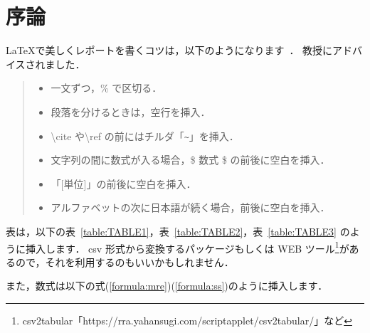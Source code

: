 \section{序論}
    \LaTeX で美しくレポートを書くコツは，以下のようになります~\cite{lit:JOURNAL}．
    教授にアドバイスされました．

    \begin{quote}
        \begin{itemize}
            \item 一文ずつ，\% で区切る．
            \item 段落を分けるときは，空行を挿入．
            \item \textbackslash cite や\textbackslash ref の前にはチルダ「\verb|~|」を挿入．
            \item 文字列の間に数式が入る場合，\$ 数式 \$ の前後に空白を挿入．
            \item 「[単位]」の前後に空白を挿入．
            \item アルファベットの次に日本語が続く場合，前後に空白を挿入．
        \end{itemize}
    \end{quote}

    \noindent
    表は，以下の表~\ref{table:TABLE1}，表~\ref{table:TABLE2}，表~\ref{table:TABLE3} のように挿入します．
    csv 形式から変換するパッケージもしくは WEB ツール\footnote{csv2tabular「https://rra.yahansugi.com/scriptapplet/csv2tabular/」など}があるので，それを利用するのもいいかもしれません．

    

    また，数式は以下の式(\ref{formula:mre})(\ref{formula:ss})のように挿入します．

    
